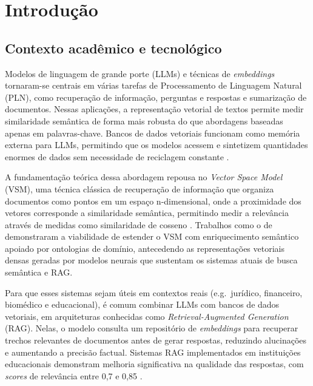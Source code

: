 
\section{Introdução}

\subsection{Contexto acadêmico e tecnológico}

Modelos de linguagem de grande porte (LLMs) e técnicas de \textit{embeddings} tornaram-se centrais em várias tarefas de Processamento de Linguagem Natural (PLN), como recuperação de informação, perguntas e respostas e sumarização de documentos. Nessas aplicações, a representação vetorial de textos permite medir similaridade semântica de forma mais robusta do que abordagens baseadas apenas em palavras-chave. Bancos de dados vetoriais funcionam como memória externa para LLMs, permitindo que os modelos acessem e sintetizem quantidades enormes de dados sem necessidade de reciclagem constante \cite{jing2024llmvdb}.

A fundamentação teórica dessa abordagem repousa no \textit{Vector Space Model} (VSM), uma técnica clássica de recuperação de informação que organiza documentos como pontos em um espaço n-dimensional, onde a proximidade dos vetores corresponde a similaridade semântica, permitindo medir a relevância através de medidas como similaridade de cosseno \cite{paiva2014semrelext}. Trabalhos como o de  demonstraram a viabilidade de estender o VSM com enriquecimento semântico apoiado por ontologias de domínio, antecedendo as representações vetoriais densas geradas por modelos neurais que sustentam os sistemas atuais de busca semântica e RAG.

Para que esses sistemas sejam úteis em contextos reais (e.g.\ jurídico, financeiro, biomédico e educacional), é comum combinar LLMs com bancos de dados vetoriais, em arquiteturas conhecidas como \textit{Retrieval-Augmented Generation} (RAG). Nelas, o modelo consulta um repositório de \textit{embeddings} para recuperar trechos relevantes de documentos antes de gerar respostas, reduzindo alucinações e aumentando a precisão factual. Sistemas RAG implementados em instituições educacionais demonstram melhoria significativa na qualidade das respostas, com \textit{scores} de relevância entre 0,7 e 0,85 \cite{bovas2025navi}.

